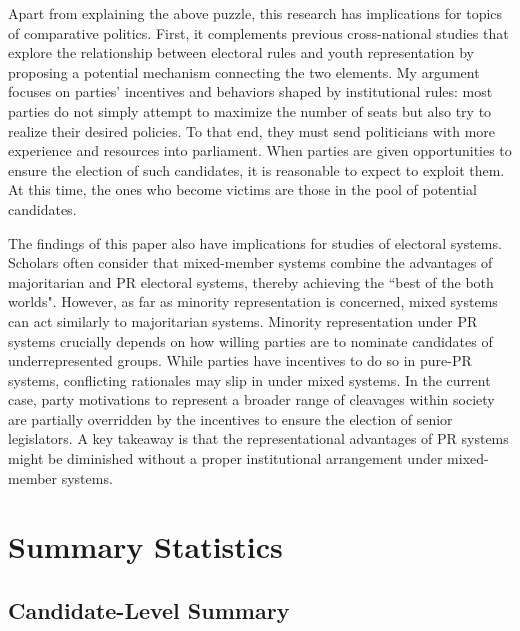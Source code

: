 \documentclass[a4paper, 11pt]{article}
\begin{document}
Apart from explaining the above puzzle, this research has implications for topics of comparative politics. First, it complements previous cross-national studies that explore the relationship between electoral rules and youth representation by proposing a potential mechanism connecting the two elements. My argument focuses on parties' incentives and behaviors shaped by institutional rules: most parties do not simply attempt to maximize the number of seats but also try to realize their desired policies. To that end, they must send politicians with more experience and resources into parliament. When parties are given opportunities to ensure the election of such candidates, it is reasonable to expect to exploit them. At this time, the ones who become victims are those in the pool of potential candidates. 

The findings of this paper also have implications for studies of electoral systems. Scholars often consider that mixed-member systems combine the advantages of majoritarian and PR electoral systems, thereby achieving the ``best of the both worlds". However, as far as minority representation is concerned, mixed systems can act similarly to majoritarian systems. Minority representation under PR systems crucially depends on how willing parties are to nominate candidates of underrepresented groups. While parties have incentives to do so in pure-PR systems, conflicting rationales may slip in under mixed systems. In the current case, party motivations to represent a broader range of cleavages within society are partially overridden by the incentives to ensure the election of senior legislators. A key takeaway is that the representational advantages of PR systems might be diminished without a proper institutional arrangement under mixed-member systems. 


\newpage




\newpage

\appendix

\setcounter{table}{0}
\setcounter{figure}{0}
\renewcommand{\thetable}{A\arabic{table}}
\renewcommand{\thefigure}{A\arabic{figure}}

\section{Summary Statistics}

\subsection{Candidate-Level Summary}
\end{document}
